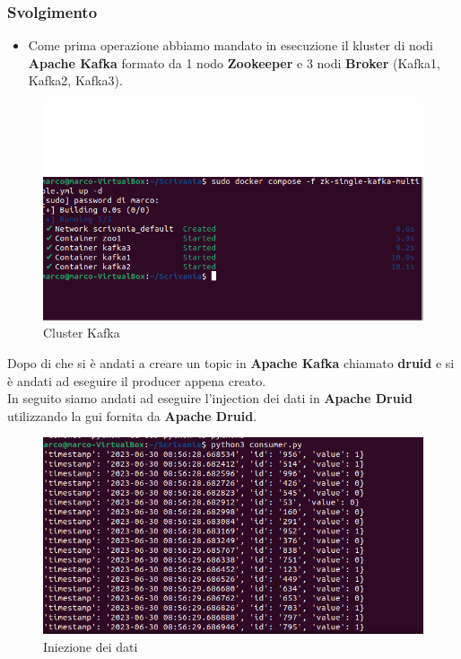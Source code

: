 \documentclass{article}
\begin{document}
\subsubsection{Svolgimento}
\begin{itemize}
    \item Come prima operazione abbiamo mandato in esecuzione il kluster di nodi \textbf{Apache Kafka} formato da 1 nodo \textbf{Zookeeper} e 3 nodi \textbf{Broker} (Kafka1, Kafka2, Kafka3).
\end{itemize}
\begin{figure}[h]
    \centering
    \includegraphics[scale=0.5]{images/kluster_producer.png}
    \caption{Cluster Kafka}
    \label{fig:my_label}
\end{figure}
Dopo di che si è andati a creare un topic in \textbf{Apache Kafka} chiamato \textbf{druid} e si è andati ad eseguire il producer appena creato.
\\In seguito siamo andati ad eseguire l'injection dei dati in \textbf{Apache Druid} utilizzando la gui fornita da \textbf{Apache Druid}.
\begin{figure}
    \centering
    \includegraphics[scale=0.5]{images/consumer.png}
    \caption{Iniezione dei dati}
    \label{fig:my_label}
\end{figure} 
\end{document}
